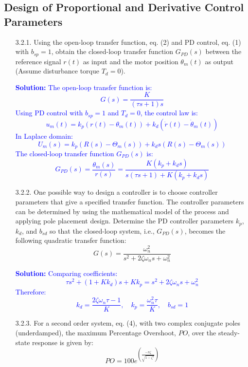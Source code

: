 \documentclass{article}
\begin{document}
\subsection{Design of Proportional and Derivative Control Parameters}
\begin{itemize}
    \item[3.2.1.] Using the open-loop transfer function, eq. (2) and PD control, eq. (1) with $b_{sp}=1$, obtain the closed-loop transfer function $G_{PD}(s)$ between the reference signal $r(t)$ as input and the motor position $\theta_m(t)$ as output (Assume disturbance torque $T_d = 0$).
    
    \textcolor{blue}{\textbf{Solution:} The open-loop transfer function is:
    \[
    G(s) = \frac{K}{(\tau s + 1) s}
    \]
    Using PD control with $b_{sp}=1$ and $T_d=0$, the control law is:
    \[
    u_m(t) = k_p (r(t) - \theta_m(t)) + k_d \left( \dot{r}(t) - \dot{\theta}_m(t) \right)
    \]
    In Laplace domain:
    \[
    U_m(s) = k_p (R(s) - \Theta_m(s)) + k_d s (R(s) - \Theta_m(s))
    \]
    The closed-loop transfer function $G_{PD}(s)$ is:
    \[
    G_{PD}(s) = \frac{\theta_m(s)}{r(s)} = \frac{K(k_p + k_d s)}{s(\tau s + 1) + K(k_p + k_d s)}
    \]}

    \item[3.2.2.] One possible way to design a controller is to choose controller parameters that give a specified transfer function. The controller parameters can be determined by using the mathematical model of the process and applying pole placement design. Determine the PD controller parameters $k_p$, $k_d$, and $b_{sd}$ so that the closed-loop system, i.e., $G_{PD}(s)$, becomes the following quadratic transfer function:
    \begin{equation}
        G(s) = \frac{\omega_n^2}{s^2 + 2\zeta \omega_n s + \omega_n^2}
    \end{equation}

    \textcolor{blue}{\textbf{Solution:} Comparing coefficients:
    \[
    \tau s^2 + (1 + K k_d)s + K k_p = s^2 + 2\zeta \omega_n s + \omega_n^2
    \]
    Therefore:
    \[
    k_d = \frac{2\zeta \omega_n \tau - 1}{K}, \quad k_p = \frac{\omega_n^2 \tau}{K}, \quad b_{sd} = 1
    \]}

    \item[3.2.3.] For a second order system, eq. (4), with two complex conjugate poles (underdamped), the maximum Percentage Overshoot, $PO$, over the steady-state response is given by:
    \begin{equation}
        PO = 100 e^{\left(\frac{-\pi \zeta}{\sqrt{1-\zeta^2}}\right)}
    \end{equation}
    

\end{itemize}
\end{document}
